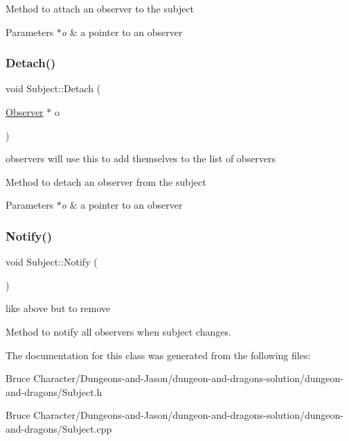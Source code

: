 Method to attach an observer to the subject 
\begin{DoxyParams}{Parameters}
{\em $\ast$o} & a pointer to an observer \\
\hline
\end{DoxyParams}
\hypertarget{class_subject_ac839596fe840efb970e36a66554e3095}{}\label{class_subject_ac839596fe840efb970e36a66554e3095} 
\subsubsection{\texorpdfstring{Detach()}{Detach()}}
{\footnotesize\ttfamily void Subject\+::\+Detach (\begin{DoxyParamCaption}\item[{\hyperlink{class_observer}{Observer} $\ast$}]{o }\end{DoxyParamCaption})\hspace{0.3cm}{\ttfamily [virtual]}}



observers will use this to add themselves to the list of observers 

Method to detach an observer from the subject 
\begin{DoxyParams}{Parameters}
{\em $\ast$o} & a pointer to an observer \\
\hline
\end{DoxyParams}
\hypertarget{class_subject_afdf01736ff099d286543b450d96215f1}{}\label{class_subject_afdf01736ff099d286543b450d96215f1} 
\subsubsection{\texorpdfstring{Notify()}{Notify()}}
{\footnotesize\ttfamily void Subject\+::\+Notify (\begin{DoxyParamCaption}{ }\end{DoxyParamCaption})\hspace{0.3cm}{\ttfamily [virtual]}}



like above but to remove 

Method to notify all observers when subject changes. 

The documentation for this class was generated from the following files\+:\begin{DoxyCompactItemize}
\item 
Bruce Character/\+Dungeons-\/and-\/\+Jason/dungeon-\/and-\/dragons-\/solution/dungeon-\/and-\/dragons/Subject.\+h\item 
Bruce Character/\+Dungeons-\/and-\/\+Jason/dungeon-\/and-\/dragons-\/solution/dungeon-\/and-\/dragons/Subject.\+cpp\end{DoxyCompactItemize}
